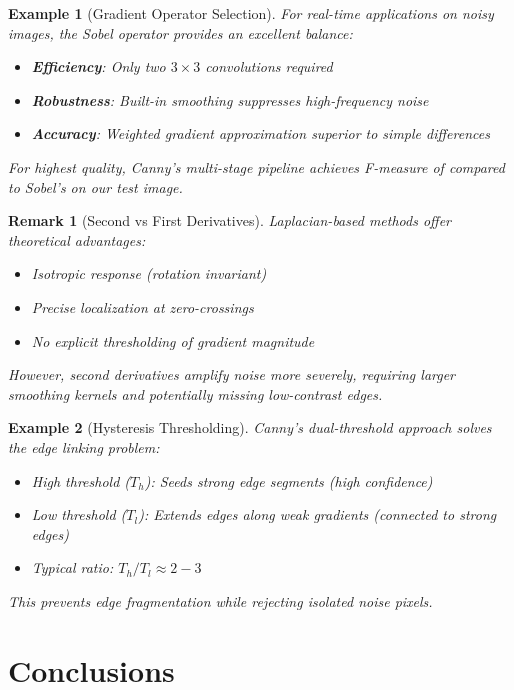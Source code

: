 \documentclass[a4paper, 11pt]{article}
\newtheorem{example}{Example}[section]
\newtheorem{remark}{Remark}[section]
\begin{document}
\begin{example}[Gradient Operator Selection]
For real-time applications on noisy images, the Sobel operator provides an excellent balance:
\begin{itemize}
\item \textbf{Efficiency}: Only two $3\times3$ convolutions required
\item \textbf{Robustness}: Built-in smoothing suppresses high-frequency noise
\item \textbf{Accuracy}: Weighted gradient approximation superior to simple differences
\end{itemize}
For highest quality, Canny's multi-stage pipeline achieves F-measure of 
compared to Sobel's  on our test image.
\end{example}

\begin{remark}[Second vs First Derivatives]
Laplacian-based methods offer theoretical advantages:
\begin{itemize}
\item Isotropic response (rotation invariant)
\item Precise localization at zero-crossings
\item No explicit thresholding of gradient magnitude
\end{itemize}
However, second derivatives amplify noise more severely, requiring larger smoothing kernels
and potentially missing low-contrast edges.
\end{remark}

\begin{example}[Hysteresis Thresholding]
Canny's dual-threshold approach solves the edge linking problem:
\begin{itemize}
\item High threshold ($T_h$): Seeds strong edge segments (high confidence)
\item Low threshold ($T_l$): Extends edges along weak gradients (connected to strong edges)
\item Typical ratio: $T_h/T_l \approx 2-3$
\end{itemize}
This prevents edge fragmentation while rejecting isolated noise pixels.
\end{example}

\section{Conclusions}
\end{document}
